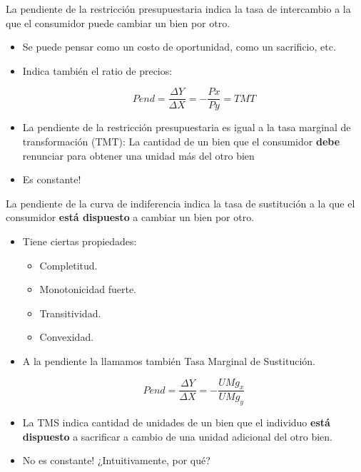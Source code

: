 \documentclass{beamer}
\begin{document}
\begin{frame}
    La pendiente de la restricción presupuestaria indica la tasa de intercambio a la que el consumidor puede cambiar un bien por otro. 
    \begin{itemize}
        \item Se puede pensar como un costo de oportunidad, como un sacrificio, etc.
        \item Indica también el ratio de precios:
        
        \[Pend = \frac{\Delta Y}{\Delta X} = -\frac{Px}{Py} = TMT\]

        \item La pendiente de la restricción presupuestaria es igual a la tasa marginal de transformación (TMT): La cantidad de un bien que el consumidor \textbf{debe} renunciar para obtener una unidad más del otro bien
        \item Es constante!
    \end{itemize}
\end{frame}

\begin{frame}
    La pendiente de la curva de indiferencia indica la tasa de sustitución a la que el consumidor \textbf{está dispuesto} a cambiar un bien por otro.
    \begin{itemize}
        \item Tiene ciertas propiedades:
        \begin{itemize}
            \item Completitud.
            \item Monotonicidad fuerte.
            \item Transitividad.
            \item Convexidad.
        \end{itemize}
        \item A la pendiente la llamamos también Tasa Marginal de Sustitución.
        
        \[Pend = \frac{\Delta Y}{\Delta X} = - \frac{UMg_x}{UMg_y}\]

        \item La TMS indica cantidad de unidades de un bien que el individuo \textbf{está dispuesto} a sacrificar a cambio de una unidad adicional del otro bien.
        \item No es constante! ¿Intuitivamente, por qué?
    \end{itemize}
\end{frame}
\end{document}
